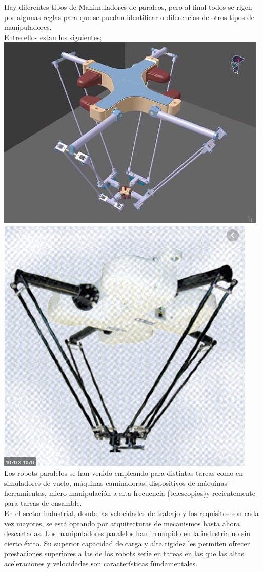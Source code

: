 \documentclass[letter,openright,12pt,spanish]{report}
\begin{document}
Hay diferentes tipos de Manimuladores de paraleos, pero al final todos se rigen por algunas reglas para que se puedan identificar o diferencias de otros tipos de manipuladores.\\
Entre ellos estan los siguientes; \\
\includegraphics[scale=1.15]{1.png} \\
\includegraphics[scale=1]{2.PNG}\\
Los robots paralelos se han venido empleando para distintas tareas como en simuladores de vuelo, máquinas caminadoras, dispositivos de máquinas–herramientas, micro manipulación a alta frecuencia (telescopios)y recientemente para tareas de ensamble. \\
En el sector industrial, donde las velocidades de trabajo y los requisitos son cada vez mayores, se está optando por arquitecturas de mecanismos hasta ahora descartadas. Los manipuladores paralelos han irrumpido en la industria no sin cierto éxito. Su superior capacidad de carga y alta rigidez les permiten ofrecer prestaciones superiores a las de los robots serie en tareas en las que las altas aceleraciones y velocidades son características fundamentales.\\
\end{document}
